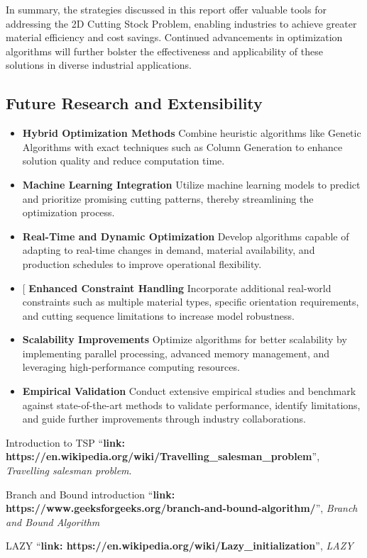 \documentclass[a4paper]{article}
\begin{document}
In summary, the strategies discussed in this report offer valuable tools for addressing the 2D Cutting Stock Problem, enabling industries to achieve greater material efficiency and cost savings. Continued advancements in optimization algorithms will further bolster the effectiveness and applicability of these solutions in diverse industrial applications.
\subsection{Future Research and Extensibility}

\begin{itemize}

    \item \textbf{Hybrid Optimization Methods} Combine heuristic algorithms like Genetic Algorithms with exact techniques such as Column Generation to enhance solution quality and reduce computation time.
    
    \item \textbf{Machine Learning Integration} Utilize machine learning models to predict and prioritize promising cutting patterns, thereby streamlining the optimization process.
    
    \item \textbf{Real-Time and Dynamic Optimization} Develop algorithms capable of adapting to real-time changes in demand, material availability, and production schedules to improve operational flexibility.
    
    \item[ \textbf{Enhanced Constraint Handling} Incorporate additional real-world constraints such as multiple material types, specific orientation requirements, and cutting sequence limitations to increase model robustness.
    
    \item \textbf{Scalability Improvements} Optimize algorithms for better scalability by implementing parallel processing, advanced memory management, and leveraging high-performance computing resources.

    
    \item \textbf{Empirical Validation} Conduct extensive empirical studies and benchmark against state-of-the-art methods to validate performance, identify limitations, and guide further improvements through industry collaborations.

\end{itemize}
\begin{thebibliography}{80}

Introduction to TSP
``\textbf{link: https://en.wikipedia.org/wiki/Travelling\_salesman\_problem}'',
\textit{Travelling salesman problem}.

Branch and Bound introduction
``\textbf{link: https://www.geeksforgeeks.org/branch-and-bound-algorithm/}'', \textit{Branch and Bound Algorithm}

LAZY
``\textbf{link: https://en.wikipedia.org/wiki/Lazy_initialization}'', \textit{LAZY}


\end{thebibliography}
\end{document}
